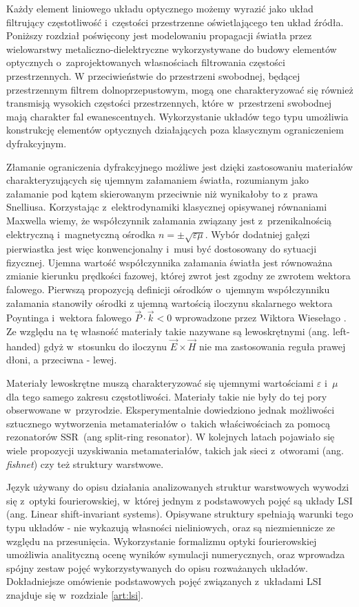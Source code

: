 Każdy element liniowego układu optycznego możemy wyrazić jako układ filtrujący częstotliwość i~częstości przestrzenne oświetlającego ten układ źródła. Poniższy rozdział poświęcony jest modelowaniu propagacji światła przez wielowarstwy metaliczno-dielektryczne wykorzystywane do  budowy elementów optycznych o~zaprojektowanych własnościach filtrowania częstości przestrzennych. W przeciwieństwie do przestrzeni swobodnej, będącej przestrzennym filtrem dolnoprzepustowym, mogą one charakteryzować się również transmisją wysokich częstości przestrzennych, które w~przestrzeni swobodnej mają charakter fal ewanescentnych. Wykorzystanie układów tego typu umożliwia konstrukcję elementów optycznych działających poza klasycznym ograniczeniem dyfrakcyjnym.

Złamanie ograniczenia dyfrakcyjnego możliwe jest dzięki zastosowaniu materiałów charakteryzujących się ujemnym załamaniem światła, rozumianym jako załamanie pod kątem skierowanym przeciwnie niż wynikałoby to z~prawa Snelliusa. Korzystając z~elektrodynamiki klasycznej opisywanej równaniami \nohyphens{Maxwella} wiemy, że współczynnik załamania związany jest z~przenikalnością elektryczną i~magnetyczną ośrodka $n = \pm \sqrt{ \varepsilon \mu}$. Wybór dodatniej gałęzi pierwiastka jest więc konwencjonalny i~musi być dostosowany do sytuacji fizycznej. Ujemna wartość współczynnika załamania światła jest równoważna zmianie kierunku prędkości fazowej, której zwrot jest zgodny ze zwrotem wektora falowego. Pierwszą propozycją definicji ośrodków o~ujemnym współczynniku załamania stanowiły ośrodki z ujemną wartością iloczynu skalarnego wektora Poyntinga i~wektora falowego $\vec{P} \cdot \vec{k} < 0$ wprowadzone przez Wiktora Wiesełago \cite{veselago1968electrodynamics}. Ze względu na tę własność materiały takie nazywane są lewoskrętnymi (ang. left-handed) gdyż w~stosunku do iloczynu $\vec{E} \times \vec{H}$ nie ma zastosowania reguła prawej dłoni, a przeciwna - lewej.

Materiały lewoskrętne muszą charakteryzować się ujemnymi wartościami $\varepsilon$ i~$\mu$ dla tego samego zakresu częstotliwości. Materiały takie nie były do tej pory obserwowane w~przyrodzie. Eksperymentalnie dowiedziono jednak możliwości sztucznego wytworzenia metamateriałów o~takich właściwościach\cite{PhysRevLett.84.4184} za pomocą rezonatorów SSR~(ang split-ring resonator). W kolejnych latach pojawiało się wiele propozycji uzyskiwania metamateriałów, takich jak sieci z~otworami (ang. \textit{fishnet}) czy też struktury warstwowe.

Język używany do opisu działania analizowanych struktur warstwowych wywodzi się z~optyki fourierowskiej, w~której jednym z podstawowych pojęć są układy LSI (ang. Linear shift-invariant systems). Opisywane struktury spełniają warunki tego typu układów - nie wykazują własności nieliniowych, oraz są niezmiennicze ze względu na przesunięcia. Wykorzystanie formalizmu optyki fourierowskiej umożliwia analityczną ocenę wyników symulacji numerycznych, oraz wprowadza spójny zestaw pojęć wykorzystywanych do opisu rozważanych układów. Dokładniejsze omówienie podstawowych pojęć związanych z~układami LSI znajduje się w~rozdziale \ref{art:lsi}.


